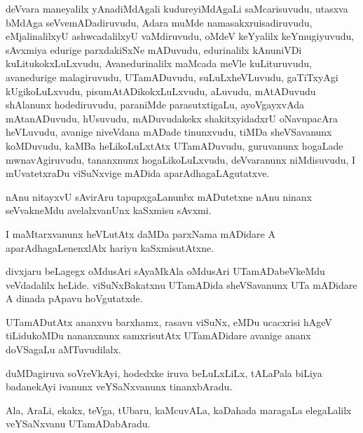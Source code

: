 \documentclass{article}
\begin{document}
\begin{mn}%
deVvara maneyalilx yAnadiMdAgali kudureyiMdAgaLi saMcarisuvudu, utasxva bMdAga 
seVvemADadiruvudu, Adara muMde namasakxruisadiruvudu, eMjalinalilxyU ashwcadalilxyU 
vaMdiruvudu, oMdeV keYyalilx keYmugiyuvudu, sAvxmiya edurige parxdakiSxNe mADuvudu,  
edurinalilx kAnuniVDi kuLitukokxLuLxvudu, Avanedurinalilx maMcada meVle kuLituruvudu, 
avanedurige malagiruvudu, UTamADuvudu, suLuLxheVLuvudu, gaTiTxyAgi kUgikoLuLxvudu, 
pisumAtADikokxLuLxvudu, aLuvudu, mAtADuvudu shAlanunx hodediruvudu, paraniMde 
parasutxtigaLu, ayoVgayxvAda mAtanADuvudu, hUsuvudu, mADuvudakekx shakitxyidadxrU 
oNavupacAra heVLuvudu, avanige niveVdana mADade tinunxvudu, tiMDa sheVSavanunx koMDuvudu, 
kaMBa heLikoLuLxtAtx UTamADuvudu, guruvanunx hogaLade mwnavAgiruvudu, tananxnunx 
hogaLikoLuLxvudu, deVvaranunx niMdisuvudu, I mUvatetxraDu viSuNxvige mADida 
aparAdhagaLAgutatxve.
\end{mn}

\begin{mn}%
nAnu nitayxvU sAvirAru tapupxgaLanunbx mADutetxne nAnu ninanx seVvakneMdu avelalxvanUnx 
kaSxmisu sAvxmi.
\end{mn}

\begin{mn}%
I maMtarxvanunx heVLutAtx daMDa parxNama mADidare A aparAdhagaLenenxlAlx hariyu 
kaSxmisutAtxne.
\end{mn}

\begin{mn}%
divxjaru beLagegx oMdusAri sAyaMkAla oMdusAri UTamADabeVkeMdu veVdadalilx heLide. 
viSuNxBakatxnu UTamADida sheVSavanunx UTa mADidare A dinada pApavu hoVgutatxde.
\end{mn}

\begin{mn}%
UTamADutAtx ananxvu barxhamx, rasavu viSuNx, eMDu ucacxrisi hAgeV tiLidukoMDu nananxnunx 
samxrisutAtx UTamADidare avanige ananx doVSagaLu aMTuvudilalx.
\end{mn}

\begin{mn}%
duMDagiruva soVreVkAyi, hodedxke iruva beLuLxLiLx, tALaPala biLiya badanekAyi ivanunx 
veYSaNxvanunx tinanxbAradu.
\end{mn}

\begin{mn}%
Ala, AraLi, ekakx, teVga, tUbaru, kaMcuvALa, kaDahada maragaLa elegaLalilx veYSaNxvanu 
UTamADabAradu.
\end{mn}
\end{document}
